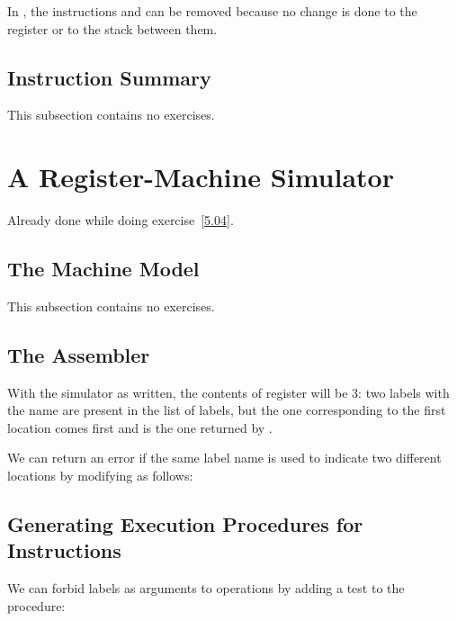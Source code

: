 \begin{exe}[5.6]
    In , the instructions  and 
     can be removed because no change is done to the 
     register or to the stack between them.
\end{exe}

\subsection{Instruction Summary}

This subsection contains no exercises.

\section{A Register-Machine Simulator}

\begin{exe}[5.7]
    Already done while doing exercise~\ref{5.04}.
\end{exe}

\subsection{The Machine Model}

This subsection contains no exercises.

\subsection{The Assembler}

\begin{exe}[5.8]
    With the simulator as written, the contents of register  will be 3: 
    two labels with the name  are present in the list of labels, but 
    the one corresponding to the first location comes first and is the one 
    returned by .

    We can return an error if the same label name is used to indicate two 
    different locations by modifying  as follows:
\end{exe}

\subsection{Generating Execution Procedures for Instructions}

\begin{exe}[5.9]
    We can forbid labels as arguments to operations by adding a test to the 
     procedure:
\end{exe}

